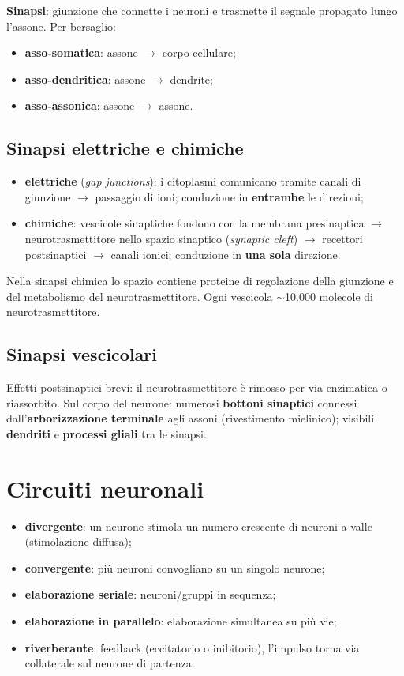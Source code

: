 \textbf{Sinapsi}: giunzione che connette i neuroni e trasmette il segnale propagato lungo l'assone.
Per bersaglio:
\begin{itemize}
  \item \textbf{asso-somatica}: assone $\rightarrow$ corpo cellulare;
  \item \textbf{asso-dendritica}: assone $\rightarrow$ dendrite;
  \item \textbf{asso-assonica}: assone $\rightarrow$ assone.
\end{itemize}

\subsection{Sinapsi elettriche e chimiche}
\begin{itemize}
  \item \textbf{elettriche} (\textit{gap junctions}): i citoplasmi comunicano tramite canali di
    giunzione $\rightarrow$ passaggio di ioni; conduzione in \textbf{entrambe} le direzioni;
  \item \textbf{chimiche}: vescicole sinaptiche fondono con la membrana presinaptica $\rightarrow$
    neurotrasmettitore nello spazio sinaptico (\textit{synaptic cleft}) $\rightarrow$ recettori
    postsinaptici $\rightarrow$ canali ionici; conduzione in \textbf{una sola} direzione.
\end{itemize}
Nella sinapsi chimica lo spazio contiene proteine di regolazione della giunzione e del metabolismo
del neurotrasmettitore. Ogni vescicola $\sim$10.000 molecole di neurotrasmettitore.

\subsection{Sinapsi vescicolari}
Effetti postsinaptici brevi: il neurotrasmettitore è rimosso per via enzimatica o riassorbito. Sul
corpo del neurone: numerosi \textbf{bottoni sinaptici} connessi dall'\textbf{arborizzazione
terminale} agli assoni (rivestimento mielinico); visibili \textbf{dendriti} e \textbf{processi
gliali} tra le sinapsi.

\section{Circuiti neuronali}
\begin{itemize}
  \item \textbf{divergente}: un neurone stimola un numero crescente di neuroni a valle (stimolazione
    diffusa);
  \item \textbf{convergente}: più neuroni convogliano su un singolo neurone;
  \item \textbf{elaborazione seriale}: neuroni/gruppi in sequenza;
  \item \textbf{elaborazione in parallelo}: elaborazione simultanea su più vie;
  \item \textbf{riverberante}: feedback (eccitatorio o inibitorio), l'impulso torna via collaterale
    sul neurone di partenza.
\end{itemize}


